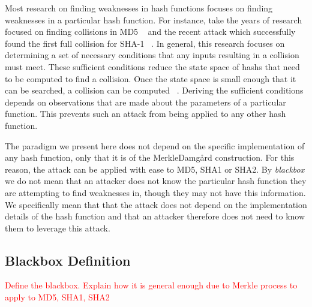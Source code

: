 Most research on finding weaknesses in hash functions focuses on finding weaknesses in a particular hash function. For instance, take the years of research focused on finding collisions in MD5 ~\cite{klima2005finding, liang2007improved, wang2005break, klima2006tunnels} and the recent attack which successfully found the first full collision for SHA-1 ~\cite{stevens2017first}. In general, this research focuses on determining a set of necessary conditions that any inputs resulting in a collision must meet. These sufficient conditions reduce the state space of hashs that need to be computed to find a collision. Once the state space is small enough that it can be searched, a collision can be computed ~\cite{sasaki2006construct}. Deriving the sufficient conditions depends on observations that are made about the parameters of a particular function. This prevents such an attack from being applied to any other hash function. 

The paradigm we present here does not depend on the specific implementation of any hash function, only that it is of the Merkle{\textendash}Damg\r{a}rd construction. For this reason, the attack can be applied with ease to MD5, SHA1 or SHA2. By \emph{blackbox} we do not mean that an attacker does not know the particular hash function they are attempting to find weaknesses in, though they may not have this information. We specifically mean that that the attack does not depend on the implementation details of the hash function and that an attacker therefore does not need to know them to leverage this attack. 

\subsection{Blackbox Definition} \label{bbdef}
\textcolor{red}{Define the blackbox. Explain how it is general enough due to Merkle process to apply to MD5, SHA1, SHA2}

